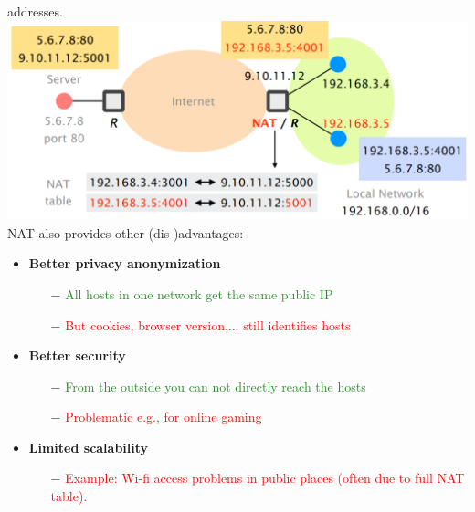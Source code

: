 \documentclass[a4paper, fontsize=8pt, landscape, DIV=1]{scrartcl}
\begin{document}
\begin{multicols*}{4}
		addresses.\\
		\includegraphics[width=\columnwidth]{images/Network_Layer/NAT_yes.png}
		NAT also provides other (dis-)advantages:
		\begin{itemize}[noitemsep]
			\item \textbf{Better privacy anonymization}
			\begin{itemize}
				\item[$-$] \textcolor{ForestGreen}{All hosts in one network get the same
					public IP}
				\item[$-$] \textcolor{Red}{But cookies, browser version,... still
					identifies hosts} 
			\end{itemize}
			\item \textbf{Better security}
			\begin{itemize}
				\item[$-$] \textcolor{ForestGreen}{From the outside you can not directly
					reach the hosts}
				\item[$-$] \textcolor{Red}{Problematic e.g., for online gaming} 
			\end{itemize}
			\item \textbf{Limited scalability}
			\begin{itemize}
				\item[$-$] \textcolor{Red}{Example: Wi-fi access problems in public
					places (often due to full NAT table).}
			\end{itemize}
		\end{itemize}
		

\end{multicols*}
\end{document}
